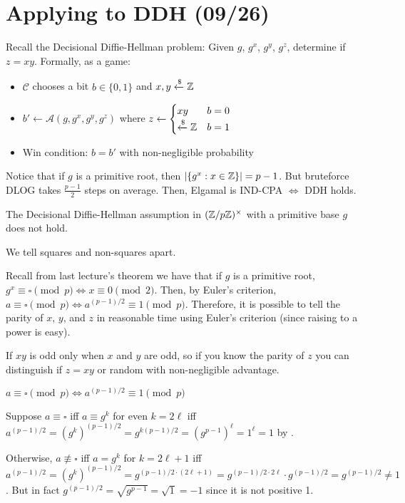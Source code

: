 \documentclass[notes]{agony}
\newcommand{\xgets}{\xleftarrow}
\begin{document}
\section{Applying to DDH (09/26)}

Recall the Decisional Diffie-Hellman problem:
Given $g$, $g^x$, $g^y$, $g^z$, determine if $z = xy$. Formally, as a game:
\begin{itemize}[nosep]
    \item $\mathcal C$ chooses a bit $b \in \{0,1\}$ and $x,y \xgets{\$}\Z$
    \item $b' \gets \mathcal A(g, g^x, g^y, g^z)$ where $z \gets \begin{cases}xy & b = 0 \\ \xgets{\$}\Z & b = 1\end{cases}$
    \item Win condition: $b = b'$ with non-negligible probability
\end{itemize}
Notice that if $g$ is a primitive root, then $\abs{\{g^x : x \in \mathbb{Z}\}}=p-1$.
But bruteforce DLOG takes $\frac{p-1}{2}$ steps on average.
Then, Elgamal is IND-CPA $\iff$ DDH holds.

\begin{prop}
    The Decisional Diffie-Hellman assumption in $(\mathbb{Z}/p\mathbb{Z})^\times$
    with a primitive base $g$ does not hold.
\end{prop}
\begin{prf}
    We tell squares and non-squares apart.

    Recall from last lecture's theorem we have that if $g$ is a primitive root,
    $g^x \equiv \square \pmod p \iff x \equiv 0 \pmod 2$.
    Then, by Euler's criterion, $a \equiv \square \pmod p \iff a^{(p-1)/2} \equiv 1 \pmod p$.
    Therefore, it is possible to tell the parity of $x$, $y$, and $z$
    in reasonable time using Euler's criterion (since raising to a power is easy).

    If $xy$ is odd only when $x$ and $y$ are odd,
    so if you know the parity of $z$ you can distinguish if $z=xy$
    or random with non-negligible advantage.
\end{prf}

\begin{prop}
    $a \equiv \square \pmod p \iff a^{(p-1)/2} \equiv 1 \pmod p$
\end{prop}
\begin{prf}
    Suppose $a \equiv \square$ iff $a \equiv g^k$ for even $k=2\ell$
    iff $a^{(p-1)/2} = (g^k)^{(p-1)/2} = g^{k(p-1)/2}=(g^{p-1})^\ell=1^\ell=1$ by \FLT{}.

    Otherwise, $a \not\equiv \square$ iff $a = g^k$ for $k=2\ell+1$
    iff $a^{(p-1)/2} = (g^k)^{(p-1)/2} = g^{(p-1)/2 \cdot (2\ell+1)}=g^{(p-1)/2\cdot 2\ell}\cdot g^{(p-1)/2} = g^{(p-1)/2} \neq 1$.
    But in fact $g^{(p-1)/2} = \sqrt{g^{p-1}} = \sqrt{1} = -1$ since it is not positive 1.
\end{prf}
\end{document}
